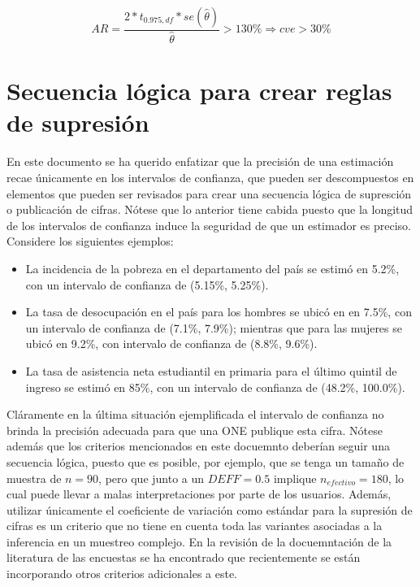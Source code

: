 \[
AR = \frac{2*t_{0.975, df} * se(\hat\theta)}{\hat\theta} > 130\% \Rightarrow cve > 30\%
\]

\hypertarget{secuencia-logica-para-crear-reglas-de-supresion}{%
\section{Secuencia lógica para crear reglas de supresión}\label{secuencia-logica-para-crear-reglas-de-supresion}}

En este documento se ha querido enfatizar que la precisión de una estimación recae únicamente en los intervalos de confianza, que pueden ser descompuestos en elementos que pueden ser revisados para crear una secuencia lógica de supresción o publicación de cifras. Nótese que lo anterior tiene cabida puesto que la longitud de los intervalos de confianza induce la seguridad de que un estimador es preciso. Considere los siguientes ejemplos:

\begin{itemize}
\tightlist
\item
  La incidencia de la pobreza en el departamento del país se estimó en 5.2\%, con un intervalo de confianza de (5.15\%, 5.25\%).
\item
  La tasa de desocupación en el país para los hombres se ubicó en en 7.5\%, con un intervalo de confianza de (7.1\%, 7.9\%); mientras que para las mujeres se ubicó en 9.2\%, con intervalo de confianza de (8.8\%, 9.6\%).
\item
  La tasa de asistencia neta estudiantil en primaria para el último quintil de ingreso se estimó en 85\%, con un intervalo de confianza de (48.2\%, 100.0\%).
\end{itemize}

Cláramente en la última situación ejemplificada el intervalo de confianza no brinda la precisión adecuada para que una ONE publique esta cifra. Nótese además que los criterios mencionados en este docuemnto deberían seguir una secuencia lógica, puesto que es posible, por ejemplo, que se tenga un tamaño de muestra de \(n=90\), pero que junto a un \(DEFF=0.5\) implique \(n_{efectivo}=180\), lo cual puede llevar a malas interpretaciones por parte de los usuarios. Además, utilizar únicamente el coeficiente de variación como estándar para la supresión de cifras es un criterio que no tiene en cuenta toda las variantes asociadas a la inferencia en un muestreo complejo. En la revisión de la docuemntación de la literatura de las encuestas se ha encontrado que recientemente se están incorporando otros criterios adicionales a este.

